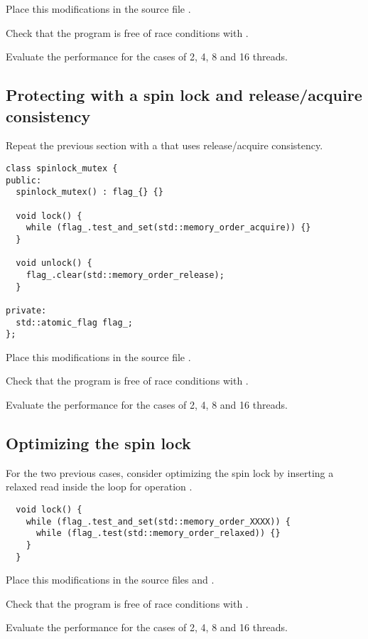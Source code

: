 Place this modifications in the source file .

Check that the program is free of race conditions with .

Evaluate the performance for the cases of 2, 4, 8 and 16 threads.

\subsection{Protecting with a spin lock and release/acquire consistency}

Repeat the previous section with a  that uses
release/acquire consistency.

\begin{lstlisting}
class spinlock_mutex {
public:
  spinlock_mutex() : flag_{} {}

  void lock() {
    while (flag_.test_and_set(std::memory_order_acquire)) {}
  }

  void unlock() {
    flag_.clear(std::memory_order_release);
  }

private:
  std::atomic_flag flag_;
};
\end{lstlisting}

Place this modifications in the source file .

Check that the program is free of race conditions with .

Evaluate the performance for the cases of 2, 4, 8 and 16 threads.

\subsection{Optimizing the spin lock}

For the two previous cases, consider optimizing the spin lock by inserting a relaxed read
inside the loop for operation .

\begin{lstlisting}
  void lock() {
    while (flag_.test_and_set(std::memory_order_XXXX)) {
      while (flag_.test(std::memory_order_relaxed)) {}
    }
  }
\end{lstlisting}

Place this modifications in the source files 
 and
.

Check that the program is free of race conditions with .

Evaluate the performance for the cases of 2, 4, 8 and 16 threads.

